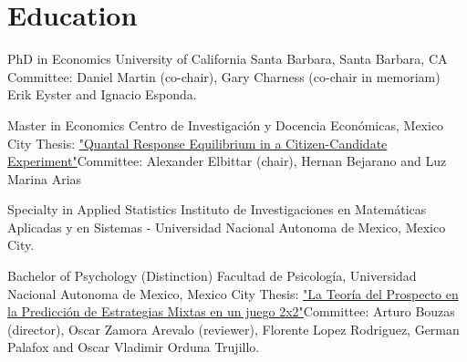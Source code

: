 \section{Education}

{PhD in Economics}
{University of California Santa Barbara, Santa Barbara, CA}
{}{}
{Committee:
	Daniel Martin (co-chair),
	Gary Charness (co-chair in memoriam)
	Erik Eyster and
	Ignacio Esponda.
}

{Master in Economics}
{Centro de Investigación y Docencia Económicas, Mexico City}
{}
{Thesis: \href{http://repositorio-digital.cide.edu/handle/11651/1719?show=full}{"Quantal Response Equilibrium in a Citizen-Candidate Experiment"}}{Committee: Alexander Elbittar (chair), Hernan Bejarano and Luz Marina Arias}

{Specialty in Applied Statistics}
{Instituto de Investigaciones en Matemáticas Aplicadas y en Sistemas - Universidad Nacional Autonoma de Mexico, Mexico City.}
{}{}{}{}

{Bachelor of Psychology (Distinction)}
{Facultad de Psicología, Universidad Nacional Autonoma de Mexico, Mexico City}
{}{Thesis: \href{http://132.248.9.195/ptd2013/noviembre/0706151/Index.html}{"La Teoría del Prospecto en la Predicción de Estrategias Mixtas en un juego 2x2"}}{Committee: Arturo Bouzas (director), Oscar Zamora Arevalo (reviewer), Florente Lopez Rodriguez, German Palafox and Oscar Vladimir Orduna Trujillo.}{}  %






